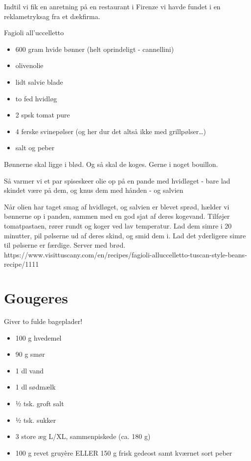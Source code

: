\documentclass[
  letterpaper,
  DIV=11,
  numbers=noendperiod]{scrreprt}
\providecommand{\tightlist}{%
  \setlength{\itemsep}{0pt}\setlength{\parskip}{0pt}}\usepackage{longtable,booktabs,array}
\begin{document}
Indtil vi fik en anretning på en restaurant i Firenze vi havde fundet i
en reklametryksag fra et dækfirma.

Fagioli all'uccelletto

\begin{itemize}
\tightlist
\item
  600 gram hvide bønner (helt oprindeligt - cannellini)
\item
  olivenolie
\item
  lidt salvie blade
\item
  to fed hvidløg
\item
  2 spsk tomat pure
\item
  4 ferske svinepølser (og her dur det altså ikke med grillpølser\ldots)
\item
  salt og peber
\end{itemize}

Bønnerne skal ligge i blød. Og så skal de koges. Gerne i noget bouillon.

Så varmer vi et par spiseskeer olie op på en pande med hvidløget - bare
lad skindet være på dem, og knus dem med hånden - og salvien

Når olien har taget smag af hvidløget, og salvien er blevet sprød,
hælder vi bønnerne op i panden, sammen med en god sjat af deres
kogevand. Tilføjer tomatpastaen, rører rundt og koger ved lav
temperatur. Lad dem simre i 20 minutter, pil pølserne ud af deres skind,
og smid dem i. Lad det yderligere simre til pølserne er færdige. Server
med brød.
https://www.visittuscany.com/en/recipes/fagioli-alluccelletto-tuscan-style-beans-recipe/1111

\hypertarget{gougeres}{%
\section{Gougeres}\label{gougeres}}

Giver to fulde bageplader!

\begin{itemize}
\tightlist
\item
  100 g hvedemel
\item
  90 g smør
\item
  1 dl vand
\item
  1 dl sødmælk
\item
  1⁄2 tsk. groft salt
\item
  1⁄2 tsk. sukker
\item
  3 store æg L/XL, sammenpiskede (ca. 180 g)
\item
  100 g revet gruyère ELLER 150 g frisk gedeost samt kværnet sort peber
\end{itemize}
\end{document}
